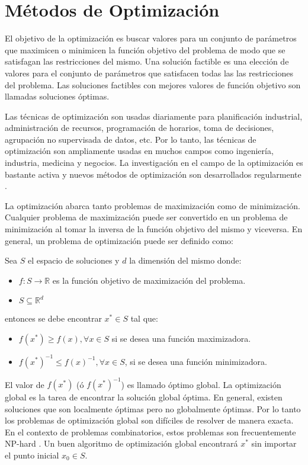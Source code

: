\chapter{Métodos de Optimización} \label{chap:mopt}

El objetivo de la optimización es buscar valores para un conjunto de
parámetros que maximicen o minimicen la función objetivo del problema de modo
que se satisfagan las restricciones del mismo. Una solución factible es una
elección de valores para el conjunto de parámetros que satisfacen todas las
las restricciones del problema. Las soluciones factibles con mejores valores de
función objetivo son llamadas soluciones óptimas.

    Las técnicas de optimización son usadas diariamente para planificación
industrial, administración de recursos, programación de horarios, toma de
decisiones, agrupación no supervisada de datos, etc. Por lo tanto, las técnicas de
optimización son ampliamente usadas en muchos campos como ingeniería, industria,
medicina y negocios. La investigación en el campo de la optimización es bastante
activa y nuevos métodos de optimización son desarrollados regularmente \cite{GO_1}.

    La optimización abarca tanto problemas de maximización como de minimización.
Cualquier problema de maximización puede ser convertido en un problema de
minimización al tomar la inversa de la función objetivo del mismo y
viceversa. En general, un problema de optimización puede ser definido como:

    Sea $S$ el espacio de soluciones y $d$ la dimensión del mismo donde:
\begin{itemize}
    \item $f: S \rightarrow \mathbb{R}$ es la función objetivo de maximización
del problema.
    \item $S \subseteq \mathbb{R}^d$
\end{itemize}
    entonces se debe encontrar $x^* \in S$ tal que:
\begin{itemize}
    \item $f(x^*) \geq f(x), \forall x \in S$ si se desea una función maximizadora.
    \item $f(x^*)^{-1} \leq f(x)^{-1}, \forall x \in S$, si se desea una función
minimizadora.
\end{itemize}

    El valor de $f(x^*)$ (ó $f(x^*)^{-1}$) es llamado óptimo global. La
optimización global es la tarea de encontrar la solución global óptima. En
general, existen soluciones que son localmente óptimas pero no globalmente
óptimas. Por lo tanto los problemas de optimización global son difíciles de
resolver de manera exacta. En el contexto de problemas combinatorios, estos
problemas son frecuentemente NP-hard \cite{GO_2}. Un buen algoritmo de
optimización global encontrará $x^*$ sin importar el punto inicial $x_0 \in S$.


